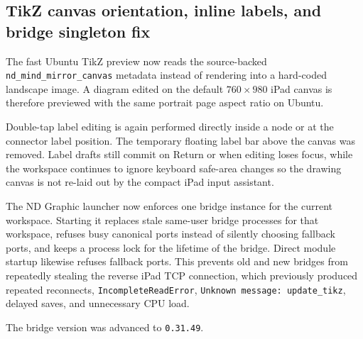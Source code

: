 \documentclass[a4paper]{article}
\title{}
\date{}
\author{Mohammad Rahmani}
\begin{document}
   \maketitle

   \begin{preview}
      \section*{TikZ canvas orientation, inline labels, and bridge singleton fix}

      The fast Ubuntu TikZ preview now reads the source-backed
      \texttt{nd\_mind\_mirror\_canvas} metadata instead of rendering into a
      hard-coded landscape image. A diagram edited on the default
      \(760\times980\) iPad canvas is therefore previewed with the same portrait
      page aspect ratio on Ubuntu.

      Double-tap label editing is again performed directly inside a node or at
      the connector label position. The temporary floating label bar above the
      canvas was removed. Label drafts still commit on Return or when editing
      loses focus, while the workspace continues to ignore keyboard safe-area
      changes so the drawing canvas is not re-laid out by the compact iPad input
      assistant.

      The ND Graphic launcher now enforces one bridge instance for the current
      workspace. Starting it replaces stale same-user bridge processes for that
      workspace, refuses busy canonical ports instead of silently choosing
      fallback ports, and keeps a process lock for the lifetime of the bridge.
      Direct module startup likewise refuses fallback ports. This prevents old
      and new bridges from repeatedly stealing the reverse iPad TCP connection,
      which previously produced repeated reconnects, \texttt{IncompleteReadError},
      \texttt{Unknown message: update\_tikz}, delayed saves, and unnecessary CPU
      load.

      The bridge version was advanced to \texttt{0.31.49}.
   \end{preview}

   
   
\end{document}

